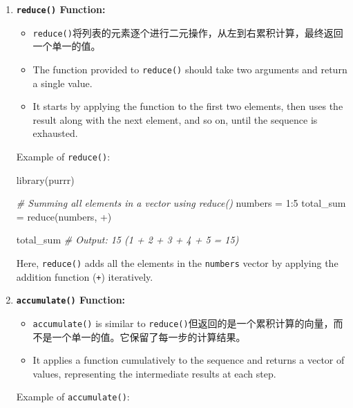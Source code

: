 \documentclass[
]{article}
\newenvironment{Shaded}{}{}
\newcommand{\AttributeTok}[1]{\textcolor[rgb]{0.49,0.56,0.16}{#1}}
\newcommand{\CommentTok}[1]{\textcolor[rgb]{0.38,0.63,0.69}{\textit{#1}}}
\newcommand{\DecValTok}[1]{\textcolor[rgb]{0.25,0.63,0.44}{#1}}
\newcommand{\FunctionTok}[1]{\textcolor[rgb]{0.02,0.16,0.49}{#1}}
\newcommand{\NormalTok}[1]{#1}
\newcommand{\OtherTok}[1]{\textcolor[rgb]{0.00,0.44,0.13}{#1}}
\newcommand{\SpecialCharTok}[1]{\textcolor[rgb]{0.25,0.44,0.63}{#1}}
\newcommand{\StringTok}[1]{\textcolor[rgb]{0.25,0.44,0.63}{#1}}
\begin{document}
\begin{enumerate}
\def\labelenumi{\arabic{enumi}.}
\item
  \textbf{\texttt{reduce()} Function:}

  \begin{itemize}
  \item
    \texttt{reduce()}将列表的元素逐个进行二元操作，从左到右累积计算，最终返回一个单一的值。
  \item
    The function provided to \texttt{reduce()} should take two arguments
    and return a single value.
  \item
    It starts by applying the function to the first two elements, then
    uses the result along with the next element, and so on, until the
    sequence is exhausted.
  \end{itemize}

  Example of \texttt{reduce()}:

\begin{Shaded}
\begin{Highlighting}[]
\FunctionTok{library}\NormalTok{(purrr)}

\CommentTok{\# Summing all elements in a vector using reduce()}
\NormalTok{numbers }\OtherTok{=} \DecValTok{1}\SpecialCharTok{:}\DecValTok{5}
\NormalTok{total\_sum }\OtherTok{=} \FunctionTok{reduce}\NormalTok{(numbers, }\StringTok{\textasciigrave{}}\AttributeTok{+}\StringTok{\textasciigrave{}}\NormalTok{)}

\NormalTok{total\_sum}
\CommentTok{\# Output: 15 (1 + 2 + 3 + 4 + 5 = 15)}
\end{Highlighting}
\end{Shaded}

  Here, \texttt{reduce()} adds all the elements in the \texttt{numbers}
  vector by applying the addition function (\texttt{+}) iteratively.
\item
  \textbf{\texttt{accumulate()} Function:}

  \begin{itemize}
  \item
    \texttt{accumulate()} is similar to
    \texttt{reduce()}但返回的是一个累积计算的向量，而不是一个单一的值。它保留了每一步的计算结果。
  \item
    It applies a function cumulatively to the sequence and returns a
    vector of values, representing the intermediate results at each
    step.
  \end{itemize}

  Example of \texttt{accumulate()}:


\end{enumerate}
\end{document}
